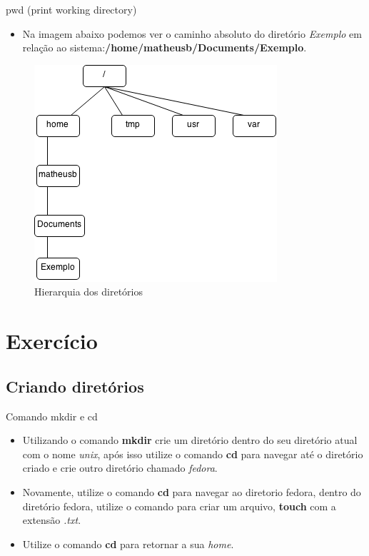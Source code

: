 \documentclass{beamer}
\begin{document}
 \begin{frame}{pwd (print working directory)}
  \begin{itemize}
  \item {
   Na imagem abaixo podemos ver o caminho absoluto do diretório \textit{Exemplo} em rela\c{c}ão ao sistema:\textbf{/home/matheusb/Documents/Exemplo}.
  }
 \end{itemize}
  \begin{figure}[h!]
        \centering
        \includegraphics[scale=0.39]{unixh.png}
        \caption{Hierarquia dos diretórios}
        \label{fig:hierarquia}
    \end{figure}
\end{frame}

\section{Exercício}

\subsection{Criando diretórios}
 \begin{frame}{Comando mkdir e cd}
  \begin{itemize}
  \item {
   Utilizando o comando \textbf{mkdir} crie um diretório dentro do seu diretório atual com o nome \textit{unix}, após isso utilize o comando \textbf{cd} para navegar até o diretório criado e crie outro diretório chamado \textit{fedora}.
  }
  \item {
   Novamente, utilize o comando \textbf{cd} para navegar ao diretorio fedora, dentro do diretório fedora, utilize o comando para criar um arquivo, \textbf{touch} com a extensão \textit{.txt}.
  }
  \item {
   Utilize o comando \textbf{cd} para retornar a sua \textit{home}.
  }
 \end{itemize}
\end{frame}
\end{document}
